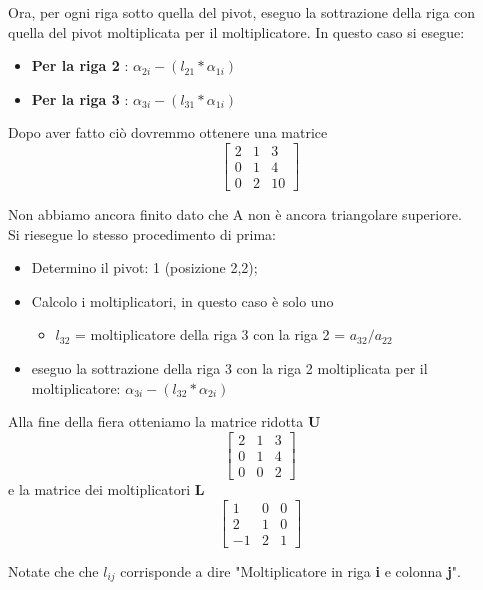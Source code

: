 Ora, per ogni riga sotto quella del pivot, eseguo la sottrazione della riga con quella del pivot moltiplicata per il moltiplicatore. In questo caso si esegue:
\begin{itemize}
\item \textbf{Per la riga 2 }: $\alpha_{2i}-(l_{21}*\alpha_{1i})$
\item \textbf{Per la riga 3 }: $\alpha_{3i}-(l_{31}*\alpha_{1i})$
\end{itemize}

Dopo aver fatto ciò dovremmo ottenere una matrice
$$
\begin{bmatrix}
2 & 1 & 3 \\
0 & 1 & 4 \\
0 & 2 & 10 
\end{bmatrix}
$$

\noindent
Non abbiamo ancora finito dato che A non è ancora triangolare superiore. 
\\
Si riesegue lo stesso procedimento di prima:
\begin{itemize}
\item Determino il pivot: 1 (posizione 2,2);
\item Calcolo i moltiplicatori, in questo caso è solo uno
	\begin{itemize}
		\item $l_{32}$ =  moltiplicatore della riga 3 con la riga 2 = $a_{32}/a_{22}$
	\end{itemize}
\item eseguo la sottrazione della riga 3 con la riga 2 moltiplicata per il moltiplicatore: $\alpha_{3i}-(l_{32}*\alpha_{2i})$
\end{itemize}

\noindent
Alla fine della fiera otteniamo la matrice ridotta \textbf{U}
$$
\begin{bmatrix}
2 & 1 & 3 \\
0 & 1 & 4 \\
0 & 0 & 2 
\end{bmatrix}
$$
\noindent
e la matrice dei moltiplicatori \textbf{L}
$$
\begin{bmatrix}
1 & 0 & 0 \\
2 & 1 & 0 \\
-1 & 2 & 1 
\end{bmatrix}
$$

\noindent
Notate che che $l_{ij}$ corrisponde a dire "Moltiplicatore in riga \textbf{i} e colonna \textbf{j}".

